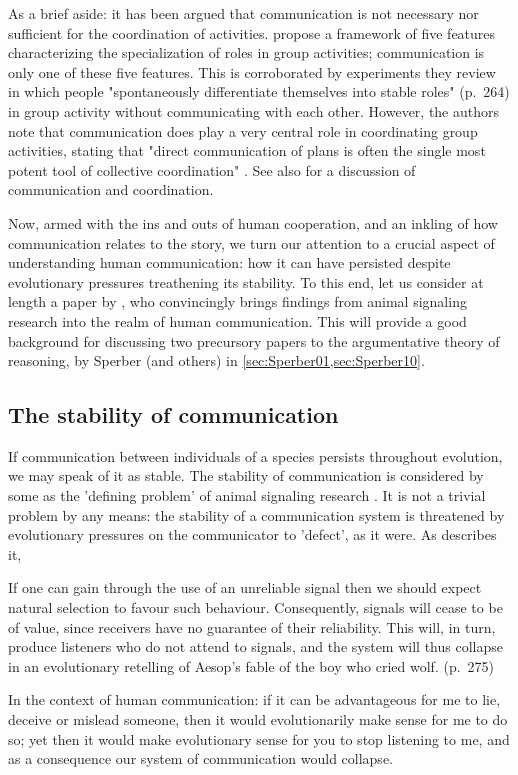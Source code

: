 As a brief aside: it has been argued that communication is not necessary nor sufficient for the coordination of activities. \citet{Goldstone24} propose a framework of five features characterizing the specialization of roles in group activities; communication is only one of these five features. This is corroborated by experiments they review in which people "spontaneously differentiate themselves into stable roles" (p.~264) in group activity without communicating with each other.
However, the authors note that communication does play a very central role in coordinating group activities, stating that "direct communication of plans is often the single most potent tool of collective coordination" \citep[p.~276]{Goldstone24}.
See also \citet{Vorobeychik17} for a discussion of communication and coordination.

Now, armed with the ins and outs of human cooperation, and an inkling of how communication relates to the story, we turn our attention to a crucial aspect of understanding human communication: how it can have persisted despite evolutionary pressures treathening its stability. To this end, let us consider at length a paper by \citet{Scott-Phillips08}, who convincingly brings findings from animal signaling research into the realm of human communication. This will provide a good background for discussing two precursory papers to the argumentative theory of reasoning, by Sperber (and others) in \cref{sec:Sperber01,sec:Sperber10}.

\subsection{The stability of communication}
\label{sec:S-P08}

If communication between individuals of a species persists throughout evolution, we may speak of it as stable. The stability of communication is considered by some as the 'defining problem' of animal signaling research \citep{Scott-Phillips08}. It is not a trivial problem by any means: the stability of a communication system is threatened by evolutionary pressures on the communicator to 'defect', as it were. As \citet{Scott-Phillips08} describes it,
\begin{quoting}
    If one can gain through the use of an unreliable signal then we should expect natural selection to favour such behaviour. Consequently, signals will cease to be of value, since receivers have no guarantee of their reliability. This will, in turn, produce listeners who do not attend to signals, and the system will thus collapse in an evolutionary retelling of Aesop’s fable of the boy who cried wolf.
    \hfill (p.~275)
\end{quoting}
In the context of human communication: if it can be advantageous for me to lie, deceive or mislead someone, then it would evolutionarily make sense for me to do so; yet then it would make evolutionary sense for you to stop listening to me, and as a consequence our system of communication would collapse.

